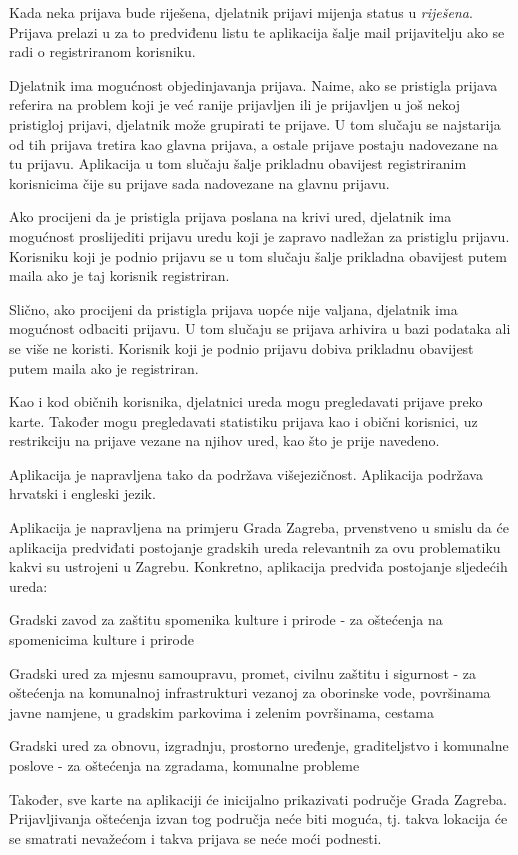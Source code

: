 		Kada neka prijava bude riješena, djelatnik prijavi mijenja status u \textit{riješena}. Prijava prelazi u za to predviđenu listu te aplikacija šalje mail  prijavitelju ako se radi o registriranom korisniku.
		
		Djelatnik ima mogućnost objedinjavanja prijava. Naime, ako se pristigla prijava referira na problem koji je već ranije prijavljen ili je prijavljen u još nekoj pristigloj prijavi, djelatnik može grupirati te prijave. U tom slučaju se najstarija od tih prijava tretira kao glavna prijava, a ostale prijave postaju nadovezane na tu prijavu. Aplikacija u tom slučaju šalje prikladnu obavijest registriranim korisnicima čije su prijave sada nadovezane na glavnu prijavu.
		
		Ako procijeni da je pristigla prijava poslana na krivi ured, djelatnik ima mogućnost proslijediti prijavu uredu koji je zapravo nadležan za pristiglu prijavu. Korisniku koji je podnio prijavu se u tom slučaju šalje prikladna obavijest putem maila ako je taj korisnik registriran.
		
		Slično, ako procijeni da pristigla prijava uopće nije valjana, djelatnik ima mogućnost odbaciti prijavu. U tom slučaju se prijava arhivira u bazi podataka ali se više ne koristi. Korisnik koji je podnio prijavu dobiva prikladnu obavijest putem maila ako je registriran.
		
		Kao i kod običnih korisnika, djelatnici ureda mogu pregledavati prijave preko karte. Također mogu pregledavati statistiku prijava kao i obični korisnici, uz restrikciju na prijave vezane na njihov ured, kao što je prije navedeno.
		
		Aplikacija je napravljena tako da podržava višejezičnost. Aplikacija podržava hrvatski i engleski jezik.
		
		Aplikacija je napravljena na primjeru Grada Zagreba, prvenstveno u smislu da će aplikacija predviđati postojanje gradskih ureda relevantnih za ovu problematiku kakvi su ustrojeni u Zagrebu. Konkretno, aplikacija predviđa postojanje sljedećih ureda:
		\begin{packed_item}
			\item Gradski zavod za zaštitu spomenika kulture i prirode - za oštećenja na spomenicima kulture i prirode
			\item Gradski ured za mjesnu samoupravu, promet, civilnu zaštitu i sigurnost - za oštećenja na komunalnoj infrastrukturi vezanoj za oborinske vode, površinama javne namjene, u gradskim parkovima i zelenim površinama, cestama
			\item Gradski ured za obnovu, izgradnju, prostorno uređenje, graditeljstvo i komunalne poslove - za oštećenja na zgradama, komunalne probleme
		\end{packed_item}
		Također, sve karte na aplikaciji će inicijalno prikazivati područje Grada Zagreba. Prijavljivanja oštećenja izvan tog područja neće biti moguća, tj. takva lokacija će se smatrati nevažećom i takva prijava se neće moći podnesti.
		

